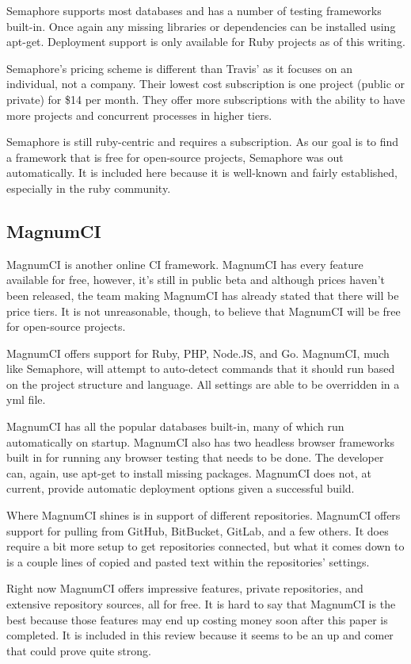 \documentclass[12pt]{ucthesis}
\begin{document}
Semaphore supports most databases and has a number of testing frameworks built-in. Once again any missing libraries or dependencies can be installed using apt-get. Deployment support is only available for Ruby projects as of this writing.

Semaphore's pricing scheme is different than Travis' as it focuses on an individual, not a company. Their lowest cost subscription is one project (public or private) for \$14 per month. They offer more subscriptions with the ability to have more projects and concurrent processes in higher tiers.

Semaphore is still ruby-centric and requires a subscription. As our goal is to find a framework that is free for open-source projects, Semaphore was out automatically. It is included here because it is well-known and fairly established, especially in the ruby community.

\subsection{MagnumCI}
MagnumCI\cite{MagnumCI} is another online CI framework. MagnumCI has every feature available for free, however, it's still in public beta and although prices haven't been released, the team making MagnumCI has already stated that there will be price tiers. It is not unreasonable, though, to believe that MagnumCI will be free for open-source projects.

MagnumCI offers support for Ruby, PHP, Node.JS, and Go. MagnumCI, much like Semaphore, will attempt to auto-detect commands that it should run based on the project structure and language. All settings are able to be overridden in a yml file.

MagnumCI has all the popular databases built-in, many of which run automatically on startup. MagnumCI also has two headless browser frameworks built in for running any browser testing that needs to be done. The developer can, again, use apt-get to install missing packages. MagnumCI does not, at current, provide automatic deployment options given a successful build.

Where MagnumCI shines is in support of different repositories. MagnumCI offers support for pulling from GitHub, BitBucket, GitLab, and a few others. It does require a bit more setup to get repositories connected, but what it comes down to is a couple lines of copied and pasted text within the repositories' settings.

Right now MagnumCI offers impressive features, private repositories, and extensive repository sources, all for free. It is hard to say that MagnumCI is the best because those features may end up costing money soon after this paper is completed. It is included in this review because it seems to be an up and comer that could prove quite strong.
\end{document}
